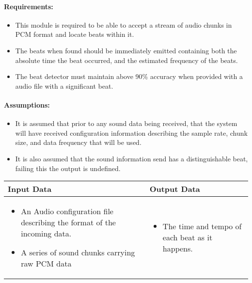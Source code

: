 \documentclass[english,12pt]{scrartcl}
\begin{document}
		\paragraph{Requirements:}
		\begin{itemize}
			\item This module is required to be able to accept a stream of audio chunks in PCM format and locate beats within it.
			\item The beats when found should be immediately emitted containing both the absolute time the beat occurred, and the estimated frequency of the beats.
			\item The beat detector must maintain above 90\% accuracy when provided with a audio file with a significant beat.
		\end{itemize}
		
		\paragraph{Assumptions:}
		\begin{itemize}
			\item It is assumed that prior to any sound data being received, that the system will have received configuration information describing the sample rate, chunk size, and data frequency that will be used.
			\item It is also assumed that the sound information send has a distinguishable beat, failing this the output is undefined.
		\end{itemize}
		
		\begin{tabular}{p{7cm}|p{7cm}}
    			\textbf{Input Data} & \textbf{Output Data} \\ \hline
			\begin{itemize}
				\item An Audio configuration file describing the format of the incoming data.
				\item A series of sound chunks carrying raw PCM data
			\end{itemize}
			&
			\begin{itemize}
				\item The time and tempo of each beat as it happens.
			\end{itemize}
		\end{tabular}
		
\end{document}
